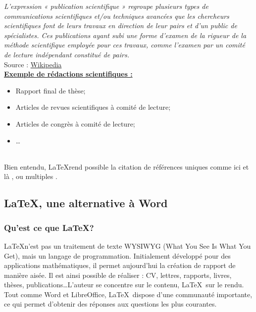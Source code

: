 \documentclass[a4paper,12pt]{report}
\begin{document}
\textit{L'expression « publication scientifique » regroupe plusieurs types de communications scientifiques et/ou techniques avancées que les chercheurs scientifiques font de leurs travaux en direction de leur pairs et d'un public de spécialistes. Ces publications ayant subi une forme d'examen de la rigueur de la méthode scientifique employée pour ces travaux, comme l'examen par un comité de lecture indépendant constitué de pairs. } \\

Source : \href{https://fr.wikipedia.org/wiki/Publication_scientifique}{Wikipedia} \\

\underline{\textbf{Exemple de rédactions scientifiques :}}\\
\begin{itemize}
\item Rapport final de thèse;
\item Articles de revues scientifiques à comité de lecture;
\item Articles de congrès à comité de lecture;
\item \ldots
\end{itemize}

\ \\

Bien entendu, \LaTeX rend possible la citation de références uniques comme ici \cite{Collomb2018a} et là \cite{Collomb2017}, ou multiples \cite{Collomb2018,Collomb2017a}.



\FloatBarrier
\subsection{\LaTeX, une alternative à Word}

\subsubsection{Qu'est ce que \LaTeX ?}
\LaTeX n'est pas un traitement de texte WYSIWYG (What You See Is What You Get), mais un langage de programmation. Initialement développé pour des applications mathématiques, il permet aujourd'hui la création de rapport de manière aisée. Il est ainsi possible de réaliser : CV, lettres, rapports, livres, thèses, publications\ldots L'auteur se concentre sur le contenu, \LaTeX~sur le rendu. \\
Tout comme Word et LibreOffice, \LaTeX~dispose d'une communauté importante, ce qui permet d'obtenir des réponses aux questions les plus courantes.
\end{document}
